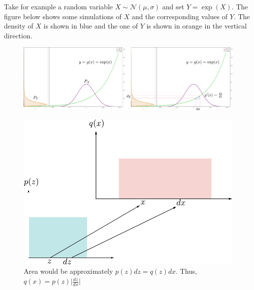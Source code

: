 Take for example a random variable $X\sim \mathcal{N}(\mu, \sigma)$ and set $Y=\exp(X)$. The figure below shows some simulations of $X$ and the corresponding values of $Y$. The density of $X$ is shown in blue and the one of $Y$ is shown in orange in the vertical direction.

\begin{figure}[t]
	\centering
	\includegraphics[scale=0.23]{./images/generative/flows/change_of_vars.pdf}
\end{figure}

\begin{figure}[t]
    \centering
    \includegraphics[scale=0.7]{./images/generative/flows/change_intuition.pdf}
    \caption{Area would be approximately $p(z)dz = q(z)dx$. Thus, $q(x) = p(z)\Big|\frac{dz}{dx}\Big|$}
    \label{fig:change_intuition}
\end{figure}


